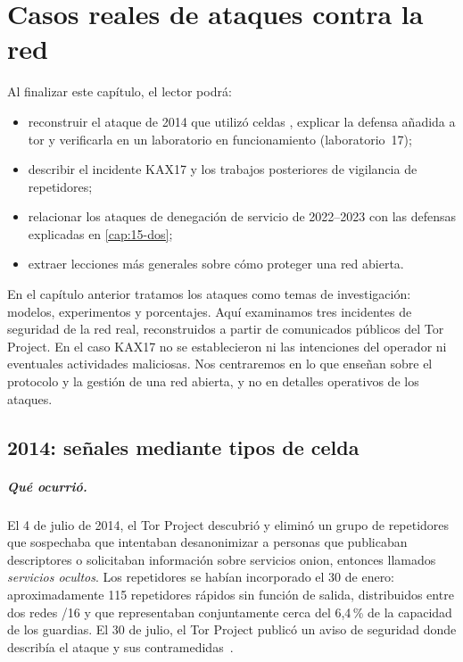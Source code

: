 \chapter{Casos reales de ataques contra la red}\label{cap:27-casi-rete}

\begin{obiettivi}
Al finalizar este capítulo, el lector podrá:
\begin{itemize}[nosep]
  \item reconstruir el ataque de 2014 que utilizó celdas , explicar la defensa añadida a tor y verificarla en un laboratorio en funcionamiento (laboratorio~17);
  \item describir el incidente KAX17 y los trabajos posteriores de vigilancia de repetidores;
  \item relacionar los ataques de denegación de servicio de 2022--2023 con las defensas explicadas en \cref{cap:15-dos};
  \item extraer lecciones más generales sobre cómo proteger una red abierta.
\end{itemize}
\end{obiettivi}

En el capítulo anterior tratamos los ataques como temas de investigación: modelos, experimentos y porcentajes. Aquí examinamos tres incidentes de seguridad de la red real, reconstruidos a partir de comunicados públicos del Tor Project. En el caso KAX17 no se establecieron ni las intenciones del operador ni eventuales actividades maliciosas. Nos centraremos en lo que enseñan sobre el protocolo y la gestión de una red abierta, y no en detalles operativos de los ataques.

\section{2014: señales mediante tipos de celda}\label{sec:casi-relayearly}

\paragraph{Qué ocurrió.} El 4 de julio de 2014, el Tor Project descubrió y eliminó un grupo de repetidores que sospechaba que intentaban desanonimizar a personas que publicaban descriptores o solicitaban información sobre servicios onion, entonces llamados \emph{servicios ocultos}. Los repetidores se habían incorporado el 30 de enero: aproximadamente 115 repetidores rápidos sin función de salida, distribuidos entre dos redes /16 y que representaban conjuntamente cerca del 6,4\,\% de la capacidad de los guardias. El 30 de julio, el Tor Project publicó un aviso de seguridad donde describía el ataque y sus contramedidas~\cite{torblog2014relayearly}.

